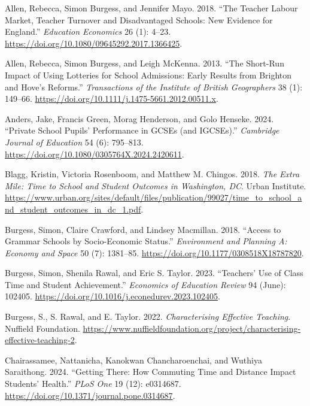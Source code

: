 \documentclass[
  12pt,
  titlepage]{article}
\newlength{\cslhangindent}
\newenvironment{CSLReferences}[2] %
 {\begin{list}{}{%
  \setlength{\itemindent}{0pt}
  \setlength{\leftmargin}{0pt}
  \setlength{\parsep}{0pt}
  \ifodd #1
   \setlength{\leftmargin}{\cslhangindent}
   \setlength{\itemindent}{-1\cslhangindent}
  \fi
  \setlength{\itemsep}{#2\baselineskip}}}
 {\end{list}}
\begin{document}
\label{refs}
\begin{CSLReferences}{1}{1}
Allen, Rebecca, Simon Burgess, and Jennifer Mayo. 2018. {``The Teacher
Labour Market, Teacher Turnover and Disadvantaged Schools: New Evidence
for {England}.''} \emph{Education Economics} 26 (1): 4--23.
\url{https://doi.org/10.1080/09645292.2017.1366425}.

Allen, Rebecca, Simon Burgess, and Leigh McKenna. 2013. {``The Short-Run
Impact of Using Lotteries for School Admissions: Early Results from
{Brighton} and {Hove}'s Reforms.''} \emph{Transactions of the Institute
of British Geographers} 38 (1): 149--66.
\url{https://doi.org/10.1111/j.1475-5661.2012.00511.x}.

Anders, Jake, Francis Green, Morag Henderson, and Golo Henseke. 2024.
{``Private School Pupils' Performance in {GCSEs} (and {IGCSEs}).''}
\emph{Cambridge Journal of Education} 54 (6): 795--813.
\url{https://doi.org/10.1080/0305764X.2024.2420611}.

Blagg, Kristin, Victoria Rosenboom, and Matthew M. Chingos. 2018.
\emph{The {Extra} {Mile}: {Time} to {School} and {Student} {Outcomes} in
{Washington}, {DC}}. Urban Institute.
\url{https://www.urban.org/sites/default/files/publication/99027/time_to_school_and_student_outcomes_in_dc_1.pdf}.

Burgess, Simon, Claire Crawford, and Lindsey Macmillan. 2018. {``Access
to Grammar Schools by Socio-Economic Status.''} \emph{Environment and
Planning A: Economy and Space} 50 (7): 1381--85.
\url{https://doi.org/10.1177/0308518X18787820}.

Burgess, Simon, Shenila Rawal, and Eric S. Taylor. 2023. {``Teachers'
Use of Class Time and Student Achievement.''} \emph{Economics of
Education Review} 94 (June): 102405.
\url{https://doi.org/10.1016/j.econedurev.2023.102405}.

Burgess, S., S. Rawal, and E. Taylor. 2022. \emph{Characterising
Effective Teaching}. Nuffield Foundation.
\url{https://www.nuffieldfoundation.org/project/characterising-effective-teaching-2}.

Chairassamee, Nattanicha, Kanokwan Chancharoenchai, and Wuthiya
Saraithong. 2024. {``Getting There: How Commuting Time and Distance
Impact Students' Health.''} \emph{PLoS One} 19 (12): e0314687.
\url{https://doi.org/10.1371/journal.pone.0314687}.


\end{CSLReferences}
\end{document}
